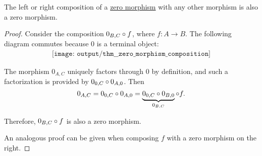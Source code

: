 \begin{lemma}\label{thm:zero_morphism_composition}
  The left or right composition of a \hyperref[def:zero_morphisms/morphism]{zero morphism} with any other morphism is also a zero morphism.
\end{lemma}
\begin{proof}
  Consider the composition \( 0_{B,C} \bincirc f \), where \( f: A \to B \). The following diagram commutes because \( 0 \) is a terminal object:
  \begin{equation*}
    \begin{aligned}
      \texttt{[image: output/thm\_\_zero\_morphism\_composition]}
    \end{aligned}
  \end{equation*}

  The morphism \( 0_{A,C} \) uniquely factors through \( 0 \) by definition, and such a factorization is provided by \( 0_{0,C} \bincirc 0_{A,0} \). Then
  \begin{equation*}
    0_{A,C} = 0_{0,C} \bincirc 0_{A,0} = \underbrace{0_{0,C} \bincirc 0_{B,0}}_{0_{B,C}} \bincirc f.
  \end{equation*}

  Therefore, \( 0_{B,C} \bincirc f \) is also a zero morphism.

  An analogous proof can be given when composing \( f \) with a zero morphism on the right.
\end{proof}

